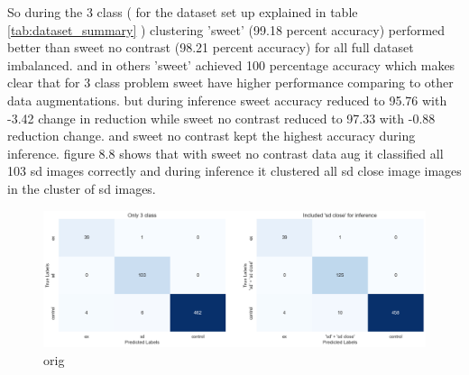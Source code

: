 So during the 3 class ( for the dataset set up explained in table \ref{tab:dataset_summary} ) clustering 'sweet' (99.18 percent accuracy) performed better than sweet no contrast (98.21 percent accuracy) for all full dataset imbalanced. and in others 'sweet' achieved 100 percentage accuracy which makes clear that for 3 class problem sweet have higher performance comparing to other data augmentations. but during inference sweet accuracy reduced to 95.76  with -3.42 change in reduction while sweet no contrast reduced to  97.33 with -0.88 reduction change. and sweet no contrast kept the highest accuracy during inference. figure 8.8 shows that with sweet no contrast data aug it classified all 103 sd images correctly and during inference it clustered all sd close image images in the cluster of sd images.

 \begin{table}[H]
    \centering
    \caption{Inference evaluation results on COSINE distance based K-means}
    \label{tab:professional_table}
\end{table}

\begin{figure}[H]
    \centering
    \includegraphics[scale=0.37]{figures/cconfusion.png} 
    \caption{orig}
    \label{fig:cconfusion}
\end{figure}

